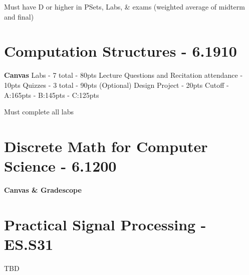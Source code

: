 \documentclass{article}
\begin{document}
Must have D or higher in PSets, Labs, \& exams (weighted average of midterm and final)

\section{Computation Structures - 6.1910}
\textbf{Canvas}
Labs - 7 total - 80pts
\newline
Lecture Questions and Recitation attendance - 10pts
\newline
Quizzes - 3 total - 90pts
\newline
(Optional) Design Project - 20pts
\newline
Cutoff - A:165pts - B:145pts - C:125pts

Must complete all labs


\section{Discrete Math for Computer Science - 6.1200}
\textbf{Canvas \& Gradescope}


\section{Practical Signal Processing - ES.S31}
TBD
\end{document}
